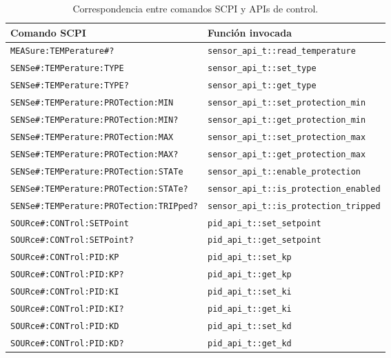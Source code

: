 \begin{table}[htbp]
    \centering
    \caption{Correspondencia entre comandos SCPI y APIs de control.}
    \label{tab:scpi-to-api}
    \begin{tabular}{ll}
        \toprule
        \textbf{Comando SCPI} & \textbf{Función invocada} \\
        \midrule
        \texttt{MEASure:TEMPerature\#?} & \texttt{sensor\_api\_t::read\_temperature} \\
        \texttt{SENSe\#:TEMPerature:TYPE} & \texttt{sensor\_api\_t::set\_type} \\
        \texttt{SENSe\#:TEMPerature:TYPE?} & \texttt{sensor\_api\_t::get\_type} \\
        \texttt{SENSe\#:TEMPerature:PROTection:MIN} & \texttt{sensor\_api\_t::set\_protection\_min} \\
        \texttt{SENSe\#:TEMPerature:PROTection:MIN?} & \texttt{sensor\_api\_t::get\_protection\_min} \\
        \texttt{SENSe\#:TEMPerature:PROTection:MAX} & \texttt{sensor\_api\_t::set\_protection\_max} \\
        \texttt{SENSe\#:TEMPerature:PROTection:MAX?} & \texttt{sensor\_api\_t::get\_protection\_max} \\
        \texttt{SENSe\#:TEMPerature:PROTection:STATe} & \texttt{sensor\_api\_t::enable\_protection} \\
        \texttt{SENSe\#:TEMPerature:PROTection:STATe?} & \texttt{sensor\_api\_t::is\_protection\_enabled} \\
        \texttt{SENSe\#:TEMPerature:PROTection:TRIPped?} & \texttt{sensor\_api\_t::is\_protection\_tripped} \\
        \texttt{SOURce\#:CONTrol:SETPoint} & \texttt{pid\_api\_t::set\_setpoint} \\
        \texttt{SOURce\#:CONTrol:SETPoint?} & \texttt{pid\_api\_t::get\_setpoint} \\
        \texttt{SOURce\#:CONTrol:PID:KP} & \texttt{pid\_api\_t::set\_kp} \\
        \texttt{SOURce\#:CONTrol:PID:KP?} & \texttt{pid\_api\_t::get\_kp} \\
        \texttt{SOURce\#:CONTrol:PID:KI} & \texttt{pid\_api\_t::set\_ki} \\
        \texttt{SOURce\#:CONTrol:PID:KI?} & \texttt{pid\_api\_t::get\_ki} \\
        \texttt{SOURce\#:CONTrol:PID:KD} & \texttt{pid\_api\_t::set\_kd} \\
        \texttt{SOURce\#:CONTrol:PID:KD?} & \texttt{pid\_api\_t::get\_kd} \\

\end{tabular}
\end{table}
